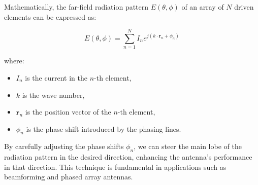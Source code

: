 Mathematically, the far-field radiation pattern \( E(\theta, \phi) \) of an array of \( N \) driven elements can be expressed as:

\[
E(\theta, \phi) = \sum_{n=1}^{N} I_n e^{j(k \cdot \mathbf{r}_n + \phi_n)}
\]

where:
\begin{itemize}
    \item \( I_n \) is the current in the \( n \)-th element,
    \item \( k \) is the wave number,
    \item \( \mathbf{r}_n \) is the position vector of the \( n \)-th element,
    \item \( \phi_n \) is the phase shift introduced by the phasing lines.
\end{itemize}

By carefully adjusting the phase shifts \( \phi_n \), we can steer the main lobe of the radiation pattern in the desired direction, enhancing the antenna’s performance in that direction. This technique is fundamental in applications such as beamforming and phased array antennas.

